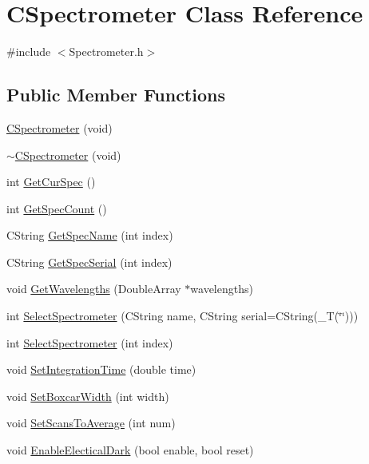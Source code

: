\hypertarget{classCSpectrometer}{
\section{CSpectrometer Class Reference}
\label{classCSpectrometer}
}


{\ttfamily \#include $<$Spectrometer.h$>$}

\subsection*{Public Member Functions}
\begin{DoxyCompactItemize}
\item 
\hyperlink{classCSpectrometer_a3a99b32f1a814d28fc44e7dee6771fd6}{CSpectrometer} (void)
\item 
\hyperlink{classCSpectrometer_afcb50fb25f6e993ae9a74a6ab129bc45}{$\sim$CSpectrometer} (void)
\item 
int \hyperlink{classCSpectrometer_a689000fea405ec9af470e3473d4ab611}{GetCurSpec} ()
\item 
int \hyperlink{classCSpectrometer_a166af7b1246577656ad2f79a1c139aa4}{GetSpecCount} ()
\item 
CString \hyperlink{classCSpectrometer_adbc48b1c1cbe397ed8228a7d1ce2efa7}{GetSpecName} (int index)
\item 
CString \hyperlink{classCSpectrometer_a3e7e41e8709f25a4d4a1903f5acb9678}{GetSpecSerial} (int index)
\item 
void \hyperlink{classCSpectrometer_aef3c19ce41e279705e8ea9bfdc8e8495}{GetWavelengths} (DoubleArray $\ast$wavelengths)
\item 
int \hyperlink{classCSpectrometer_a4527f950adf93f5284ee524aa30642b8}{SelectSpectrometer} (CString name, CString serial=CString(\_\-T(\char`\"{}\char`\"{})))
\item 
int \hyperlink{classCSpectrometer_af89a8438325c82aea9c8f18aaae096d5}{SelectSpectrometer} (int index)
\item 
void \hyperlink{classCSpectrometer_a0a0c81d5d07acf6c2fe0321063e8d6e5}{SetIntegrationTime} (double time)
\item 
void \hyperlink{classCSpectrometer_a677c5d75311bbeaac73aa136b703cf96}{SetBoxcarWidth} (int width)
\item 
void \hyperlink{classCSpectrometer_a8c64c393489f17a79146d9df26510be8}{SetScansToAverage} (int num)
\item 
void \hyperlink{classCSpectrometer_aa58f1ae664a6a146e4c72a7c77f86e7e}{EnableElecticalDark} (bool enable, bool reset)

\end{DoxyCompactItemize}
